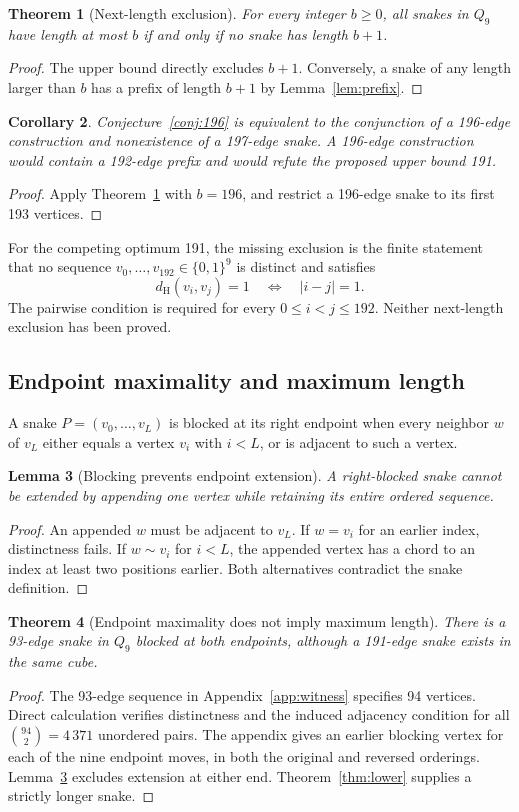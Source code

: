 \documentclass[11pt,a4paper]{article}
\newtheorem{theorem}{Theorem}[section]
\newtheorem{lemma}[theorem]{Lemma}
\newtheorem{corollary}[theorem]{Corollary}
\theoremstyle{definition}
\theoremstyle{remark}
\newcommand{\Q}{Q}
\newcommand{\Ham}{d_{\mathrm H}}
\begin{document}
\begin{theorem}[Next-length exclusion]\label{thm:next}
For every integer $b\ge0$, all snakes in $\Q_9$ have length at most $b$ if and only if no snake has length $b+1$.
\end{theorem}
\begin{proof}
The upper bound directly excludes $b+1$. Conversely, a snake of any length larger than $b$ has a prefix of length $b+1$ by Lemma~\ref{lem:prefix}.
\end{proof}

\begin{corollary}
Conjecture~\ref{conj:196} is equivalent to the conjunction of a 196-edge construction and nonexistence of a 197-edge snake. A 196-edge construction would contain a 192-edge prefix and would refute the proposed upper bound 191.
\end{corollary}
\begin{proof}
Apply Theorem~\ref{thm:next} with $b=196$, and restrict a 196-edge snake to its first 193 vertices.
\end{proof}
For the competing optimum 191, the missing exclusion is the finite statement that no sequence $v_0,\ldots,v_{192}\in\{0,1\}^9$ is distinct and satisfies
\[
\Ham(v_i,v_j)=1\quad\Longleftrightarrow\quad |i-j|=1.
\]
The pairwise condition is required for every $0\le i<j\le192$. Neither next-length exclusion has been proved.

\subsection{Endpoint maximality and maximum length}
A snake $P=(v_0,\ldots,v_L)$ is blocked at its right endpoint when every neighbor $w$ of $v_L$ either equals a vertex $v_i$ with $i<L$, or is adjacent to such a vertex.
\begin{lemma}[Blocking prevents endpoint extension]\label{lem:block}
A right-blocked snake cannot be extended by appending one vertex while retaining its entire ordered sequence.
\end{lemma}
\begin{proof}
An appended $w$ must be adjacent to $v_L$. If $w=v_i$ for an earlier index, distinctness fails. If $w\sim v_i$ for $i<L$, the appended vertex has a chord to an index at least two positions earlier. Both alternatives contradict the snake definition.
\end{proof}

\begin{theorem}[Endpoint maximality does not imply maximum length]
There is a 93-edge snake in $\Q_9$ blocked at both endpoints, although a 191-edge snake exists in the same cube.
\end{theorem}
\begin{proof}
The 93-edge sequence in Appendix~\ref{app:witness} specifies 94 vertices. Direct calculation verifies distinctness and the induced adjacency condition for all $\binom{94}{2}=4\,371$ unordered pairs. The appendix gives an earlier blocking vertex for each of the nine endpoint moves, in both the original and reversed orderings. Lemma~\ref{lem:block} excludes extension at either end. Theorem~\ref{thm:lower} supplies a strictly longer snake.
\end{proof}
\end{document}
